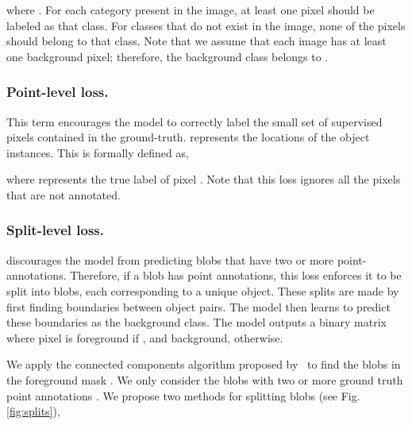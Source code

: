 \documentclass[runningheads]{llncs}
\begin{document}
where .
For each category present in the image, at least one pixel should be labeled as that class. For classes that do not exist in the image, none of the pixels should belong to that class. Note that we assume that each image has at least one background pixel; therefore, the background class belongs to .

\subsubsection{Point-level loss.}This  term encourages the model to correctly label the small set of supervised pixels  contained in the ground-truth.  represents the locations of the object instances. This is formally defined as,

where  represents the true label of pixel . Note that this loss ignores all the pixels that are not annotated.

\subsubsection{Split-level loss.}  discourages the model from predicting blobs that have two or more point-annotations. Therefore, if a blob has  point annotations, this loss enforces it to be split into  blobs, each corresponding to a unique object. These splits are made by first finding boundaries between object pairs. The model then learns to predict these boundaries as the background class. The model outputs a binary matrix  where pixel  is foreground if , and background, otherwise.

We apply the connected components algorithm proposed by~\cite{wu2005optimizing} to find the blobs  in the foreground mask . We only consider the blobs with two or more ground truth point annotations . We propose two methods for splitting blobs (see Fig. \ref{fig:splits}),
\end{document}
